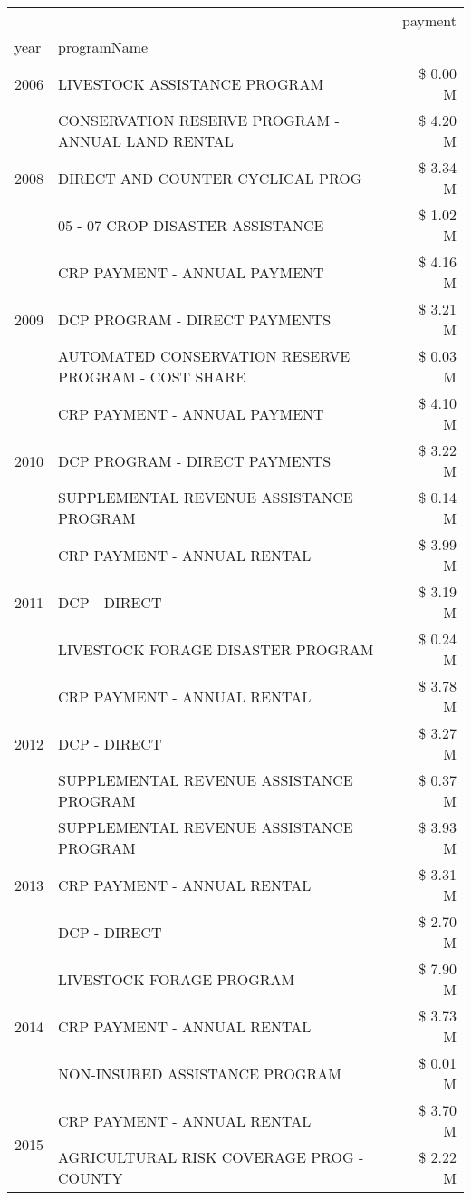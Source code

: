 \begin{tabular}{llr}
\toprule
 &  & payment \\
year & programName &  \\
\midrule
2006 & LIVESTOCK ASSISTANCE PROGRAM & \$ 0.00 M \\
\cline{1-3}
\multirow[t]{3}{*}{2008} & CONSERVATION RESERVE PROGRAM - ANNUAL LAND RENTAL & \$ 4.20 M \\
 & DIRECT AND COUNTER CYCLICAL PROG & \$ 3.34 M \\
 & 05 - 07 CROP DISASTER ASSISTANCE & \$ 1.02 M \\
\cline{1-3}
\multirow[t]{3}{*}{2009} & CRP PAYMENT - ANNUAL PAYMENT & \$ 4.16 M \\
 & DCP PROGRAM - DIRECT PAYMENTS & \$ 3.21 M \\
 & AUTOMATED CONSERVATION RESERVE PROGRAM - COST SHARE & \$ 0.03 M \\
\cline{1-3}
\multirow[t]{3}{*}{2010} & CRP PAYMENT - ANNUAL PAYMENT & \$ 4.10 M \\
 & DCP PROGRAM - DIRECT PAYMENTS & \$ 3.22 M \\
 & SUPPLEMENTAL REVENUE ASSISTANCE PROGRAM & \$ 0.14 M \\
\cline{1-3}
\multirow[t]{3}{*}{2011} & CRP PAYMENT - ANNUAL RENTAL & \$ 3.99 M \\
 & DCP - DIRECT & \$ 3.19 M \\
 & LIVESTOCK FORAGE DISASTER PROGRAM & \$ 0.24 M \\
\cline{1-3}
\multirow[t]{3}{*}{2012} & CRP PAYMENT - ANNUAL RENTAL & \$ 3.78 M \\
 & DCP - DIRECT & \$ 3.27 M \\
 & SUPPLEMENTAL REVENUE ASSISTANCE PROGRAM & \$ 0.37 M \\
\cline{1-3}
\multirow[t]{3}{*}{2013} & SUPPLEMENTAL REVENUE ASSISTANCE PROGRAM & \$ 3.93 M \\
 & CRP PAYMENT - ANNUAL RENTAL & \$ 3.31 M \\
 & DCP - DIRECT & \$ 2.70 M \\
\cline{1-3}
\multirow[t]{3}{*}{2014} & LIVESTOCK FORAGE PROGRAM & \$ 7.90 M \\
 & CRP PAYMENT - ANNUAL RENTAL & \$ 3.73 M \\
 & NON-INSURED ASSISTANCE PROGRAM & \$ 0.01 M \\
\cline{1-3}
\multirow[t]{3}{*}{2015} & CRP PAYMENT - ANNUAL RENTAL & \$ 3.70 M \\
 & AGRICULTURAL RISK COVERAGE PROG - COUNTY & \$ 2.22 M \\

\end{tabular}
